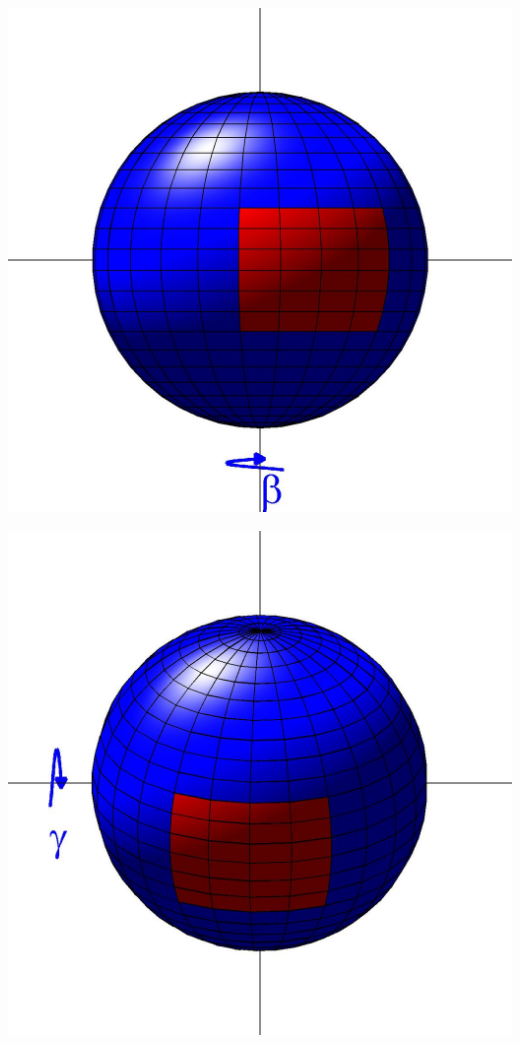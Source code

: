 \documentclass[12pt]{minimal}
\begin{document}
\begin{minipage}{0.22\textwidth}
\centering
\includegraphics[width=\textwidth]{sphere2_3}\\
\end{minipage}
\begin{minipage}{0.22\textwidth}
\centering
\includegraphics[width=\textwidth]{sphere2_4}\\
\end{minipage}
\end{document}
